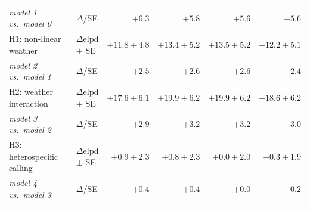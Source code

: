 \begin{table}[htbp]
\begin{tabular}{@{}l l rrrr@{}}
\hspace{1.2em}\textit{model 1 vs.\ model 0} & $\Delta$/SE & {\boldmath$+6.3$} & {\boldmath$+5.8$} & {\boldmath$+5.6$} & {\boldmath$+5.6$} \\
\addlinespace[2pt]
\hspace{0.2em}H1: non-linear weather & $\Delta$elpd $\pm$ SE & {\boldmath$+11.8 \pm 4.8$} & {\boldmath$+13.4 \pm 5.2$} & {\boldmath$+13.5 \pm 5.2$} & {\boldmath$+12.2 \pm 5.1$} \\
\hspace{1.2em}\textit{model 2 vs.\ model 1} & $\Delta$/SE & {\boldmath$+2.5$} & {\boldmath$+2.6$} & {\boldmath$+2.6$} & {\boldmath$+2.4$} \\
\addlinespace[2pt]
\hspace{0.2em}H2: weather interaction & $\Delta$elpd $\pm$ SE & {\boldmath$+17.6 \pm 6.1$} & {\boldmath$+19.9 \pm 6.2$} & {\boldmath$+19.9 \pm 6.2$} & {\boldmath$+18.6 \pm 6.2$} \\
\hspace{1.2em}\textit{model 3 vs.\ model 2} & $\Delta$/SE & {\boldmath$+2.9$} & {\boldmath$+3.2$} & {\boldmath$+3.2$} & {\boldmath$+3.0$} \\
\addlinespace[2pt]
\hspace{0.2em}H3: heterospecific calling & $\Delta$elpd $\pm$ SE & $+0.9 \pm 2.3$ & $+0.8 \pm 2.3$ & $+0.0 \pm 2.0$ & $+0.3 \pm 1.9$ \\
\hspace{1.2em}\textit{model 4 vs.\ model 3} & $\Delta$/SE & $+0.4$ & $+0.4$ & $+0.0$ & $+0.2$ \\
\addlinespace[2pt]
\bottomrule
\end{tabular}
\par\vspace{4pt}
\begin{minipage}{\linewidth}\footnotesize\raggedright

\end{minipage}
\end{table}
